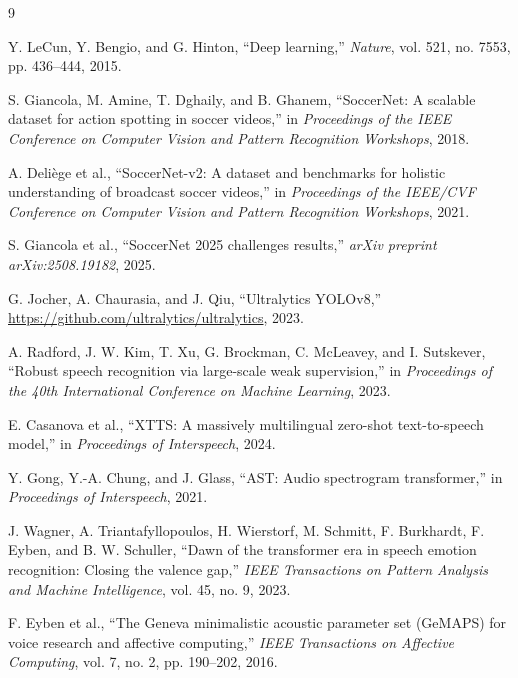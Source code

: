 \documentclass[10pt,twocolumn,a4paper]{article}
\begin{document}
	\begin{thebibliography}{9}

		Y. LeCun, Y. Bengio, and G. Hinton,
		``Deep learning,''
		\textit{Nature}, vol. 521, no. 7553, pp. 436--444, 2015.

		S. Giancola, M. Amine, T. Dghaily, and B. Ghanem,
		``SoccerNet: A scalable dataset for action spotting in soccer videos,''
		in \textit{Proceedings of the IEEE Conference on Computer Vision and Pattern Recognition Workshops},
		2018.

		A. Deli\`ege et al.,
		``SoccerNet-v2: A dataset and benchmarks for holistic understanding of broadcast soccer videos,''
		in \textit{Proceedings of the IEEE/CVF Conference on Computer Vision and Pattern Recognition Workshops},
		2021.

		S. Giancola et al.,
		``SoccerNet 2025 challenges results,''
		\textit{arXiv preprint arXiv:2508.19182}, 2025.

		G. Jocher, A. Chaurasia, and J. Qiu,
		``Ultralytics YOLOv8,''
		\url{https://github.com/ultralytics/ultralytics}, 2023.

		A. Radford, J. W. Kim, T. Xu, G. Brockman, C. McLeavey, and I. Sutskever,
		``Robust speech recognition via large-scale weak supervision,''
		in \textit{Proceedings of the 40th International Conference on Machine Learning},
		2023.

		E. Casanova et al.,
		``XTTS: A massively multilingual zero-shot text-to-speech model,''
		in \textit{Proceedings of Interspeech},
		2024.

		Y. Gong, Y.-A. Chung, and J. Glass,
		``AST: Audio spectrogram transformer,''
		in \textit{Proceedings of Interspeech},
		2021.

		J. Wagner, A. Triantafyllopoulos, H. Wierstorf, M. Schmitt, F. Burkhardt, F. Eyben, and B. W. Schuller,
		``Dawn of the transformer era in speech emotion recognition: Closing the valence gap,''
		\textit{IEEE Transactions on Pattern Analysis and Machine Intelligence}, vol. 45, no. 9, 2023.

		F. Eyben et al.,
		``The Geneva minimalistic acoustic parameter set (GeMAPS) for voice research and affective computing,''
		\textit{IEEE Transactions on Affective Computing}, vol. 7, no. 2, pp. 190--202, 2016.


\end{thebibliography}
\end{document}
